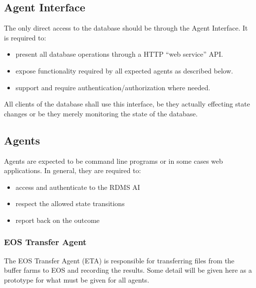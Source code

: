 \documentclass[pdftex,12pt,letter]{article}
\begin{document}
\subsection{Agent Interface}

The only direct access to the database should be through the Agent
Interface.  It is required to:
\begin{itemize}
\item present all database operations through a HTTP ``web service'' API.

\item expose functionality required by all expected agents as described below.

\item support and require authentication/authorization where needed.
\end{itemize}

\noindent All clients of the database shall use this interface, be they actually
effecting state changes or be they merely monitoring the state of the
database.

\subsection{Agents}
\label{subsec:agents}

Agents are expected to be command line programs or in some cases web
applications.  In general, they are required to:

\begin{itemize}
\item access and authenticate to the RDMS AI
\item respect the allowed state transitions
\item report back on the outcome
\end{itemize}



\subsubsection{EOS Transfer Agent}
\label{subsec:eosxferagent}

The EOS Transfer Agent (ETA) is responsible for transferring files
from the buffer farms to EOS and recording the results.  Some detail will be
given here as a prototype for what must be given for all agents.
\end{document}
